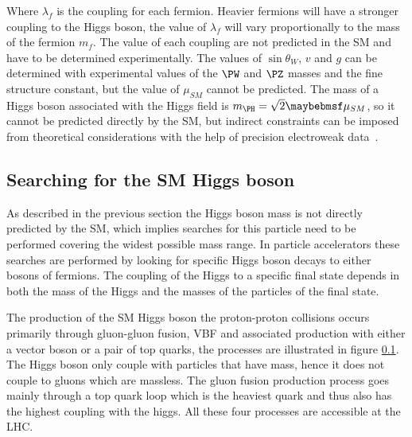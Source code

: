 Where $\lambda_{f}$ is the coupling for each fermion. Heavier fermions will have a stronger coupling to the Higgs boson, the value of $\lambda_{f}$ will vary proportionally to the mass of the fermion $m_{f}$. The value of each coupling are not predicted in the \gls{SM} and have to be determined experimentally. The values of $\sin{\theta_{W}}$, $v$ and $g$ can be determined with experimental values of the $\PW$ and $\PZ$ masses and the fine structure constant, but the value of $\mu_{SM}$ cannot be predicted. The mass of a Higgs boson associated with the Higgs field is $m_{\PH}=\sqrt{2}\mu_{SM}$, so it cannot be predicted directly by the \gls{SM}, but indirect constraints can be imposed from theoretical considerations with the help of precision electroweak data~\cite{SITE:lepewwg}.

\subsection{Searching for the SM Higgs boson}
\label{SUBSECTION:Theory_SM_SearchingSMHiggs}

As described in the previous section the Higgs boson mass is not directly predicted by the \gls{SM}, which implies searches for this particle need to be performed covering the widest possible mass range. In particle accelerators these searches are performed by looking for specific Higgs boson decays to either bosons of fermions. The coupling of the Higgs to a specific final state depends in both the mass of the Higgs and the masses of the particles of the final state. 

The production of the \gls{SM} Higgs boson the proton-proton collisions occurs primarily through gluon-gluon fusion, \gls{VBF} and associated production with either a vector boson or a pair of top quarks, the processes are illustrated in figure \ref{SUBSECTION:Theory_SM_SearchingSMHiggs}. The Higgs boson only couple with particles that have mass, hence it does not couple to gluons which are massless. The gluon fusion production process goes mainly through a top quark loop which is the heaviest quark and thus also has the highest coupling with the higgs. All these four processes are accessible at the \gls{LHC}.

